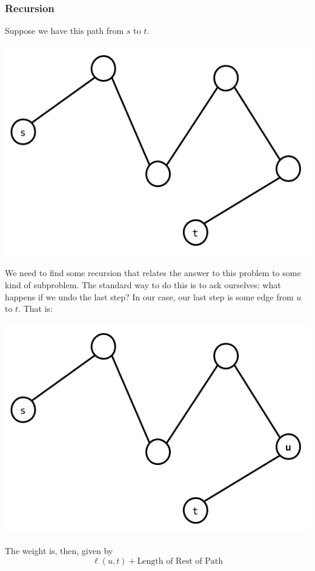\documentclass[letterpaper]{article}
\begin{document}
\subsubsection{Recursion}
Suppose we have this path from $s$ to $t$. 
\begin{center}
    \includegraphics[scale=0.4]{../assets/st_path_1.png}
\end{center}
We need to find some recursion that relates the answer to this problem to some kind of subproblem. The standard way to do this is to ask ourselves: what happens if we undo the last step? In our case, our last step is some edge from $u$ to $t$. That is: 
\begin{center}
    \includegraphics[scale=0.4]{../assets/st_path_2.png}
\end{center}
The weight is, then, given by 
\[\ell(u, t) + \text{Length of Rest of Path}\]
\end{document}
